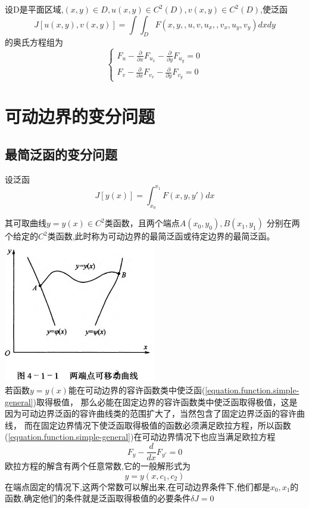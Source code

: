 \documentclass{article}
\begin{document}
\begin{corollary}
设D是平面区域,$(x,y) \in D ,u(x,y) \in C^2(D),v(x,y) \in C^2(D)$,使泛函
$$
J[u(x,y),v(x,y)]=\int\int_{D}F(x,y,,u,v,u_x,,v_x,u_y,v_y)dxdy
$$
的奥氏方程组为
$$
\left\{
  \begin{array}{ll}
   F_u -\frac{\partial}{\partial x}F_{u_x}-\frac{\partial}{\partial y}F_{u_y} = 0 \\
   F_v -\frac{\partial}{\partial x}F_{v_x}-\frac{\partial}{\partial y}F_{v_y} = 0
  \end{array}
\right.
$$
\end{corollary}

\section{可动边界的变分问题}
\subsection{最简泛函的变分问题}
设泛函
\begin{equation}
  J[y(x)]=\int_{x_0}^{x_1}F(x,y,y')dx
\label{equation.function.simple-general}
\end{equation}

其可取曲线$y = y(x) \in C^2$类函数，且两个端点$A(x_0,y_0),B(x_1,y_1)$ 分别在两个给定的$C^2$类函数,此时称为可动边界的最简泛函或待定边界的最简泛函。\\

\includegraphics[width=0.5\textwidth]{image/limit-move}\\

若函数$y=y(x)$能在可动边界的容许函数类中使泛函(\ref{equation.function.simple-general})取得极值，
那么必能在固定边界的容许函数类中使泛函取得极值，这是因为可动边界泛函的容许曲线类的范围扩大了，当然包含了固定边界泛函的容许曲线，
而在固定边界情况下使泛函取得极值的函数必须满足欧拉方程，所以函数(\ref{equation.function.simple-general})在可动边界情况下也应当满足欧拉方程
$$
F_y - \frac{d}{dx}F_{y'} =0
$$
欧拉方程的解含有两个任意常数,它的一般解形式为
$$y=y(x,c_1,c_2)$$
在端点固定的情况下,这两个常数可以解出来,在可动边界条件下,他们都是$x_0,x_1$的函数,确定他们的条件就是泛函取得极值的必要条件$\delta J=0$
\end{document}
